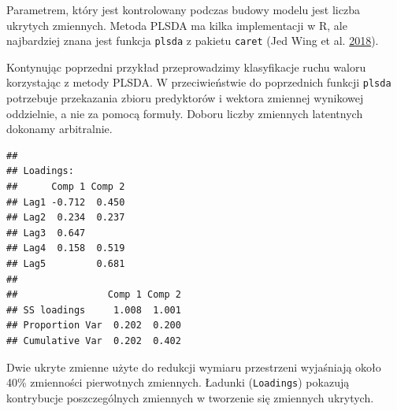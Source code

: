 \documentclass[]{book}
\newenvironment{Shaded}{\begin{snugshade}}{\end{snugshade}}
\newcommand{\DataTypeTok}[1]{\textcolor[rgb]{0.13,0.29,0.53}{#1}}
\newcommand{\DecValTok}[1]{\textcolor[rgb]{0.00,0.00,0.81}{#1}}
\newcommand{\KeywordTok}[1]{\textcolor[rgb]{0.13,0.29,0.53}{\textbf{#1}}}
\newcommand{\NormalTok}[1]{#1}
\newcommand{\OperatorTok}[1]{\textcolor[rgb]{0.81,0.36,0.00}{\textbf{#1}}}
\newcommand{\StringTok}[1]{\textcolor[rgb]{0.31,0.60,0.02}{#1}}
\theoremstyle{plain}
\theoremstyle{definition}
\theoremstyle{definition}
\theoremstyle{definition}
\theoremstyle{definition}
\theoremstyle{remark}
\let\BeginKnitrBlock\begin \let\EndKnitrBlock\end
\begin{document}
Parametrem, który jest kontrolowany podczas budowy modelu jest liczba ukrytych zmiennych. Metoda PLSDA ma kilka implementacji w R, ale najbardziej znana jest funkcja \texttt{plsda} z pakietu \texttt{caret} (Jed Wing et al. \protect\hyperlink{ref-kuhn}{2018}).

\BeginKnitrBlock{example}
\protect\hypertarget{exm:plsda}{}{\label{exm:plsda} }Kontynując poprzedni przykład przeprowadzimy klasyfikacje ruchu waloru korzystając z metody PLSDA. W przeciwieństwie do poprzednich funkcji \texttt{plsda} potrzebuje przekazania zbioru predyktorów i wektora zmiennej wynikowej oddzielnie, a nie za pomocą formuły. Doboru liczby zmiennych latentnych dokonamy arbitralnie.
\EndKnitrBlock{example}

\begin{Shaded}
\end{Shaded}

\begin{verbatim}
## 
## Loadings:
##      Comp 1 Comp 2
## Lag1 -0.712  0.450
## Lag2  0.234  0.237
## Lag3  0.647       
## Lag4  0.158  0.519
## Lag5         0.681
## 
##                Comp 1 Comp 2
## SS loadings     1.008  1.001
## Proportion Var  0.202  0.200
## Cumulative Var  0.202  0.402
\end{verbatim}

Dwie ukryte zmienne użyte do redukcji wymiaru przestrzeni wyjaśniają około 40\% zmienności pierwotnych zmiennych. Ładunki (\texttt{Loadings}) pokazują kontrybucje poszczególnych zmiennych w tworzenie się zmiennych ukrytych.

\begin{Shaded}
\end{Shaded}
\end{document}
